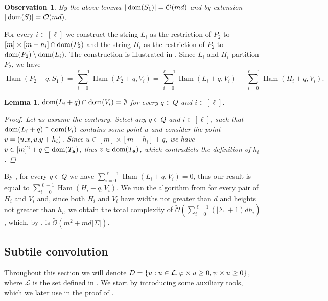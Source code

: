 \documentclass[11pt, letterpaper]{article}
\theoremstyle{plain}
\newtheorem{lemma}{Lemma}
\newtheorem{observation}{Observation}
\theoremstyle{definition}
\theoremstyle{remark}
\renewcommand{\O}{\mathcal{O}}
\newcommand{\tO}{\tilde{\mathcal{O}}}
\renewcommand{\L}{\mathcal{L}}
\newcommand{\set}[1]{\left\lbrace #1 \right\rbrace}
\DeclareMathOperator*{\Ham}{Ham}
\begin{document}
\begin{observation}\label{area_bound}
	By the above lemma $|\d{S_1}| = \O(md)$ and by extension $|\d{S}| = \O(md)$.
\end{observation}

For every $i \in [\ell]$ we construct the string $L_i$ as the restriction of $P_2$ to $[m] \times [m - h_i] \cap \operatorname*{dom}(P_2)$
and the string $H_i$ as the restriction of $P_2$ to $\operatorname*{dom}(P_2) \setminus \operatorname*{dom}(L_i)$.
The construction is illustrated in .
Since $L_i$ and $H_i$ partition $P_2$, we have
\[ \Ham(P_2 + q, S_1) = \sum_{i = 0}^{\ell - 1} \Ham(P_2 + q, V_i) = \sum_{i = 0}^{\ell - 1} \Ham(L_i + q, V_i) + \sum_{i = 0}^{\ell - 1} \Ham(H_i + q, V_i). \]

\begin{lemma}\label{pattern_height_reduction}
	$\operatorname*{dom}(L_i + q) \cap \operatorname*{dom}(V_i) = \emptyset$ for every $q \in Q$ and $i \in [\ell]$.
	\begin{proof}
		Let us assume the contrary.
		Select any $q \in Q$ and $i \in [\ell]$, such that $\operatorname*{dom}(L_i + q) \cap \operatorname*{dom}(V_i)$ 
		contains some point $u$ and consider the point $v = (u.x, u.y + h_i)$.
		Since $u \in [m] \times [m - h_i] + q$, we have $v \in [m]^2 + q \subseteq \operatorname*{dom}(T_\mathbf{a})$, thus $v \in \operatorname*{dom}(T_\mathbf{a})$, which contradicts the definition of $h_i$.
	\end{proof}
\end{lemma}

By , for every $q \in Q$ we have $\sum_{i = 0}^{\ell - 1} \Ham(L_i + q, V_i) = 0$, thus our result is equal to $\sum_{i = 0}^{\ell - 1} \Ham(H_i + q, V_i)$.
We run the algorithm from  for every pair of $H_i$ and $V_i$ and, since both $H_i$ and $V_i$ have widths not greater than $d$ and heights not greater than $h_i$, we obtain the total complexity of $\tO(\sum_{i = 0}^{\ell - 1} (|\Sigma| + 1)dh_i)$, 
which, by , is $\tO(m^2 + md|\Sigma|)$.




\newcommand{\W}{\mathcal{W}}
\subsection{Subtile convolution} \label{subtile_convolution_proof}

Throughout this section we will denote $D = \set{u : u \in \L, \h{u} \ge 0, \s{u} \ge 0}$, where $\L$ is the set defined in .
We start by introducing some auxiliary tools, which we later use in the proof of .
\end{document}
